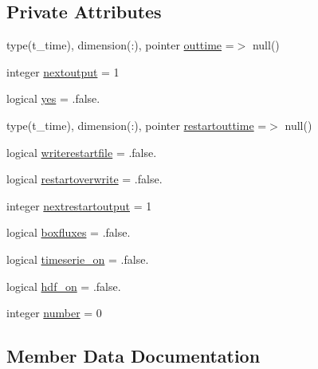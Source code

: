 \subsection*{Private Attributes}
\begin{DoxyCompactItemize}
\item 
type(t\+\_\+time), dimension(\+:), pointer \mbox{\hyperlink{structmoduleirrigation_1_1t__output_a982900ed12495728e38efe7b9a605ae9}{outtime}} =$>$ null()
\item 
integer \mbox{\hyperlink{structmoduleirrigation_1_1t__output_ac8cc22f58d2087a1b8515f41be96e74c}{nextoutput}} = 1
\item 
logical \mbox{\hyperlink{structmoduleirrigation_1_1t__output_a2cdea4db462e3a1e627e267b167cf071}{yes}} = .false.
\item 
type(t\+\_\+time), dimension(\+:), pointer \mbox{\hyperlink{structmoduleirrigation_1_1t__output_a7061b86fbb10e2ea9e32b3cfd2dc3a77}{restartouttime}} =$>$ null()
\item 
logical \mbox{\hyperlink{structmoduleirrigation_1_1t__output_acc3c9508f0e55857b8a27fee98708e77}{writerestartfile}} = .false.
\item 
logical \mbox{\hyperlink{structmoduleirrigation_1_1t__output_a2c2018c911c429673c10ed1239d39ed4}{restartoverwrite}} = .false.
\item 
integer \mbox{\hyperlink{structmoduleirrigation_1_1t__output_a4327c238f1dcae76328448283d7952c4}{nextrestartoutput}} = 1
\item 
logical \mbox{\hyperlink{structmoduleirrigation_1_1t__output_ad9f49dd4d1a7f5774c24f0b9aa588b59}{boxfluxes}} = .false.
\item 
logical \mbox{\hyperlink{structmoduleirrigation_1_1t__output_abfa63c76af246ae49db097093f435814}{timeserie\+\_\+on}} = .false.
\item 
logical \mbox{\hyperlink{structmoduleirrigation_1_1t__output_a97515a7092d22409ff2c6a326aee299a}{hdf\+\_\+on}} = .false.
\item 
integer \mbox{\hyperlink{structmoduleirrigation_1_1t__output_abeb1dca35594ad0c7d4c79a3ae0f8a0f}{number}} = 0
\end{DoxyCompactItemize}


\subsection{Member Data Documentation}
\mbox{\label{structmoduleirrigation_1_1t__output_ad9f49dd4d1a7f5774c24f0b9aa588b59}} 
